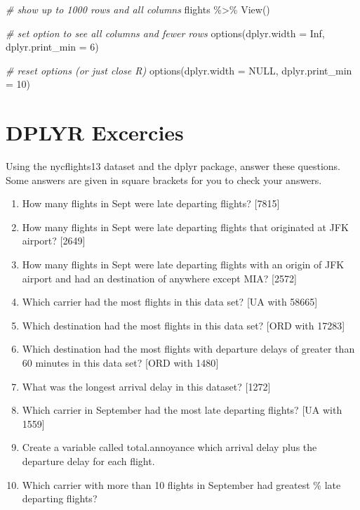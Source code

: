 \documentclass[
]{book}
\newenvironment{Shaded}{\begin{snugshade}}{\end{snugshade}}
\newcommand{\AttributeTok}[1]{\textcolor[rgb]{0.77,0.63,0.00}{#1}}
\newcommand{\CommentTok}[1]{\textcolor[rgb]{0.56,0.35,0.01}{\textit{#1}}}
\newcommand{\ConstantTok}[1]{\textcolor[rgb]{0.00,0.00,0.00}{#1}}
\newcommand{\DecValTok}[1]{\textcolor[rgb]{0.00,0.00,0.81}{#1}}
\newcommand{\FunctionTok}[1]{\textcolor[rgb]{0.00,0.00,0.00}{#1}}
\newcommand{\NormalTok}[1]{#1}
\newcommand{\SpecialCharTok}[1]{\textcolor[rgb]{0.00,0.00,0.00}{#1}}
\providecommand{\tightlist}{%
  \setlength{\itemsep}{0pt}\setlength{\parskip}{0pt}}
\begin{document}
\begin{Shaded}
\begin{Highlighting}[]
\CommentTok{\# show up to 1000 rows and all columns}
\NormalTok{flights }\SpecialCharTok{\%\textgreater{}\%} \FunctionTok{View}\NormalTok{()}

\CommentTok{\# set option to see all columns and fewer rows}
\FunctionTok{options}\NormalTok{(}\AttributeTok{dplyr.width =} \ConstantTok{Inf}\NormalTok{, }\AttributeTok{dplyr.print\_min =} \DecValTok{6}\NormalTok{)}

\CommentTok{\# reset options (or just close R)}
\FunctionTok{options}\NormalTok{(}\AttributeTok{dplyr.width =} \ConstantTok{NULL}\NormalTok{, }\AttributeTok{dplyr.print\_min =} \DecValTok{10}\NormalTok{)}
\end{Highlighting}
\end{Shaded}

\hypertarget{dplyr-excercies}{%
\chapter{DPLYR Excercies}\label{dplyr-excercies}}

Using the nycflights13 dataset and the dplyr package, answer these questions. Some answers are given in square brackets for you to check your answers.

\begin{enumerate}
\def\labelenumi{\arabic{enumi}.}
\tightlist
\item
  How many flights in Sept were late departing flights? {[}7815{]}
\item
  How many flights in Sept were late departing flights that originated at JFK airport? {[}2649{]}
\item
  How many flights in Sept were late departing flights with an origin of JFK airport and had an destination of anywhere except MIA? {[}2572{]}
\item
  Which carrier had the most flights in this data set? {[}UA with 58665{]}
\item
  Which destination had the most flights in this data set? {[}ORD with 17283{]}
\item
  Which destination had the most flights with departure delays of greater than 60 minutes in this data set? {[}ORD with 1480{]}
\item
  What was the longest arrival delay in this dataset? {[}1272{]}
\item
  Which carrier in September had the most late departing flights? {[}UA with 1559{]}
\item
  Create a variable called total.annoyance which arrival delay plus the departure delay for each flight.
\item
  Which carrier with more than 10 flights in September had greatest \% late departing flights?
\end{enumerate}

  
\end{document}
